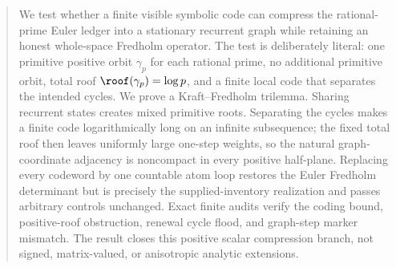 \begin{abstract}
We test whether a finite visible symbolic code can compress the rational-prime
Euler ledger into a stationary recurrent graph while retaining an honest
whole-space Fredholm operator.  The test is deliberately literal: one
primitive positive orbit $\gamma_p$ for each rational prime, no additional
primitive orbit, total roof $\roof(\gamma_p)=\log p$, and a finite local code
that separates the intended cycles.  We prove a Kraft--Fredholm trilemma.
Sharing recurrent states creates mixed primitive roots.  Separating the
cycles makes a finite code logarithmically long on an infinite subsequence;
the fixed total roof then leaves uniformly large one-step weights, so the
natural graph-coordinate adjacency is noncompact in every positive
half-plane.  Replacing every codeword by one countable atom loop restores the
Euler Fredholm determinant but is precisely the supplied-inventory
realization and passes arbitrary controls unchanged.  Exact finite audits
verify the coding bound, positive-roof obstruction, renewal cycle flood, and
graph-step marker mismatch.  The result closes this positive scalar
compression branch, not signed, matrix-valued, or anisotropic analytic
extensions.
\end{abstract}
